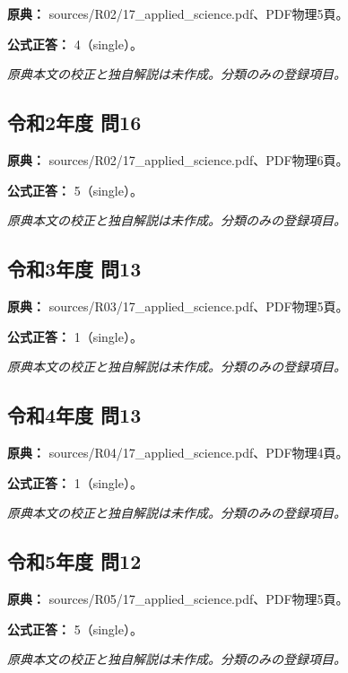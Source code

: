 \noindent\textbf{原典：} sources/R02/17\_applied\_science.pdf、PDF物理5頁。

\textbf{公式正答：} 4（single）。

\par\textit{原典本文の校正と独自解説は未作成。分類のみの登録項目。}

\subsection{令和2年度 問16}
\label{q:r02-reg-applied-16}

\noindent\textbf{原典：} sources/R02/17\_applied\_science.pdf、PDF物理6頁。

\textbf{公式正答：} 5（single）。

\par\textit{原典本文の校正と独自解説は未作成。分類のみの登録項目。}

\subsection{令和3年度 問13}
\label{q:r03-reg-applied-13}

\noindent\textbf{原典：} sources/R03/17\_applied\_science.pdf、PDF物理5頁。

\textbf{公式正答：} 1（single）。

\par\textit{原典本文の校正と独自解説は未作成。分類のみの登録項目。}

\subsection{令和4年度 問13}
\label{q:r04-reg-applied-13}

\noindent\textbf{原典：} sources/R04/17\_applied\_science.pdf、PDF物理4頁。

\textbf{公式正答：} 1（single）。

\par\textit{原典本文の校正と独自解説は未作成。分類のみの登録項目。}

\subsection{令和5年度 問12}
\label{q:r05-reg-applied-12}

\noindent\textbf{原典：} sources/R05/17\_applied\_science.pdf、PDF物理5頁。

\textbf{公式正答：} 5（single）。

\par\textit{原典本文の校正と独自解説は未作成。分類のみの登録項目。}

